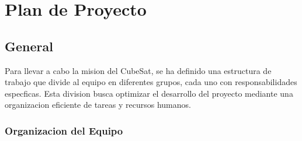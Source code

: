 \section{Plan de Proyecto}

  \subsection{General}
    Para llevar a cabo la mision del CubeSat, se ha definido una estructura de trabajo que
    divide al equipo en diferentes grupos, cada uno con responsabilidades especficas. Esta division
    busca optimizar el desarrollo del proyecto mediante una organizacion eficiente de tareas y
    recursos humanos.
    \subsubsection{Organizacion del Equipo}
